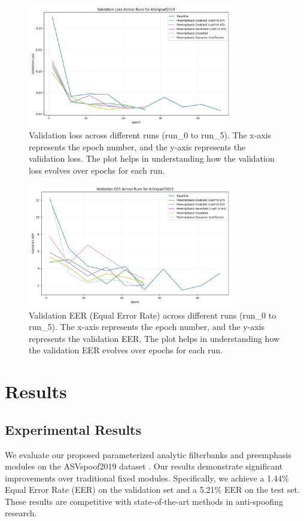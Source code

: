 \documentclass{article} %
\begin{document}
\begin{figure}[h]
    \centering
    \includegraphics[width=0.8\textwidth]{val_loss_ASVspoof2019_across_runs.png}
    \caption{Validation loss across different runs (run\_0 to run\_5). The x-axis represents the epoch number, and the y-axis represents the validation loss. The plot helps in understanding how the validation loss evolves over epochs for each run.}
    \label{fig:val_loss}
\end{figure}

\begin{figure}[h]
    \centering
    \includegraphics[width=0.8\textwidth]{val_eer_ASVspoof2019_across_runs.png}
    \caption{Validation EER (Equal Error Rate) across different runs (run\_0 to run\_5). The x-axis represents the epoch number, and the y-axis represents the validation EER. The plot helps in understanding how the validation EER evolves over epochs for each run.}
    \label{fig:val_eer}
\end{figure}

\section{Results}
\label{sec:results}
\subsection{Experimental Results}
\label{subsec:experimental_results}
We evaluate our proposed parameterized analytic filterbanks and preemphasis modules on the ASVspoof2019 dataset \citep{asvspoof2019}. Our results demonstrate significant improvements over traditional fixed modules. Specifically, we achieve a 1.44\% Equal Error Rate (EER) on the validation set and a 5.21\% EER on the test set. These results are competitive with state-of-the-art methods in anti-spoofing research.
\end{document}

